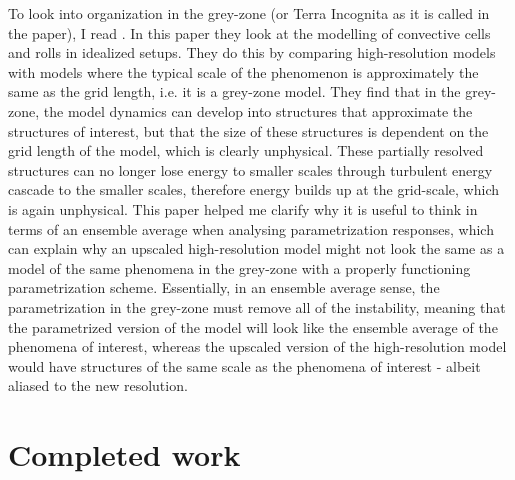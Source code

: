 \documentclass[11pt,a4paper]{article}
\begin{document}
To look into organization in the grey-zone (or Terra Incognita as it is called in the paper), I read
\cite{ching2014convectively}. In this paper they look at the modelling of convective cells and rolls in
idealized setups. They do this by comparing high-resolution models with models where the typical
scale of the phenomenon is approximately the same as the grid length, i.e. it is a grey-zone model.
They find that in the grey-zone, the model dynamics can develop into structures that approximate the
structures of interest, but that the size of these structures is dependent on the grid length of the
model, which is clearly unphysical. These partially resolved structures can no longer lose energy to
smaller scales through turbulent energy cascade to the smaller scales, therefore energy builds up at
the grid-scale, which is again unphysical.  This paper helped me clarify why it is useful to think
in terms of an ensemble average when analysing parametrization responses, which can explain why an
upscaled high-resolution model might not look the same as a model of the same phenomena in the
grey-zone with a properly functioning parametrization scheme. Essentially, in an ensemble average
sense, the parametrization in the grey-zone must remove all of the instability, meaning that the
parametrized version of the model will look like the ensemble average of the phenomena of interest,
whereas the upscaled version of the high-resolution model would have structures of the same scale as
the phenomena of interest - albeit aliased to the new resolution.

\section{Completed work}


\end{document}

